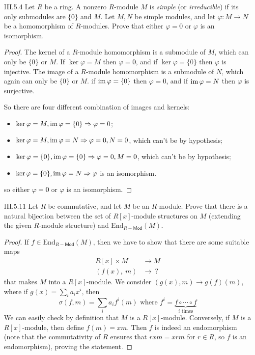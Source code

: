 \begin{problem}{III.5.4}
Let $R$ be a ring. A nonzero $R$-module $M$ is \emph{simple} (or \emph{irreducible}) if its only 
submodules are $\{0\}$ and $M$. Let $M, N$ be simple modules, and let $\varphi: M \to N$ be 
a homomorphism of $R$-modules. Prove that either $\varphi = 0$ or $\varphi$ is an isomorphism. 
\end{problem}
\begin{proof}
The kernel of a $R$-module homomorphism is a submodule of $M$, which can only be $\{0\}$ or $M$. If $\ker \varphi = M$ then $\varphi = 0$, and if $\ker \varphi = \{0\}$ then $\varphi$ is injective. The image of a $R$-module homomorphism is a submodule of $N$, which again can only be $\{0\}$ or $M$. if $\operatorname{im} \varphi = \{0\}$ then $\varphi = 0$, and if $\operatorname{im} \varphi = N$ then $\varphi$ is surjective. 

So there are four different combination of images and kernels:
\begin{itemize}
    \setlength\itemsep{0pt}
    \item $\ker \varphi = M, \operatorname{im} \varphi = \{0\} \Rightarrow \varphi = 0$;
    \item $\ker \varphi = M, \operatorname{im} \varphi = N \Rightarrow \varphi = 0, N = 0$, which can't be by hypothesis;
    \item $\ker \varphi = \{0\}, \operatorname{im} \varphi = \{0\} \Rightarrow \varphi = 0, M = 0$, which can't be by hypothesis;
    \item $\ker \varphi = \{0\}, \operatorname{im} \varphi = N \Rightarrow \varphi$ is an isomorphism.
\end{itemize}
so either $\varphi = 0$ or $\varphi$ is an isomorphism. 
\end{proof}

\begin{problem}{III.5.11}
Let $R$ be commutative, and let $M$ be an $R$-module. Prove that there is a natural bijection between the set of $R[x]$-module structures on $M$ (extending the given $R$-module structure) and $\text{End}_{R-\mathsf{Mod}}(M)$.
\end{problem}
\begin{proof}
If $f \in \text{End}_{R-\textsf{Mod}}(M)$, then we have to show that there are some suitable maps
\begin{align*}
R[x] \times M &\to M \\
(f(x), \:m) &\to \: ?
\end{align*}
that makes $M$ into a $R[x]$-module. We consider $(g(x),m) \to g(f)(m)$, where if $g(x) = \sum_i a_i x^i$, then
\[
\sigma(f,m) = \sum_{i} a_i f^i(m) \text{ where } f^i = \underbrace{f \circ \cdots \circ f}_{i\text{ times}}
\]
We can easily check by definition that $M$ is a $R[x]$-module. Conversely, if $M$ is a $R[x]$-module, then define $f(m) = xm$. Then $f$ is indeed an endomorphism (note that the commutativity of $R$ ensures that $rxm = xrm$ for $r \in R$, so $f$ is an endomorphism), proving the statement.
\end{proof}

